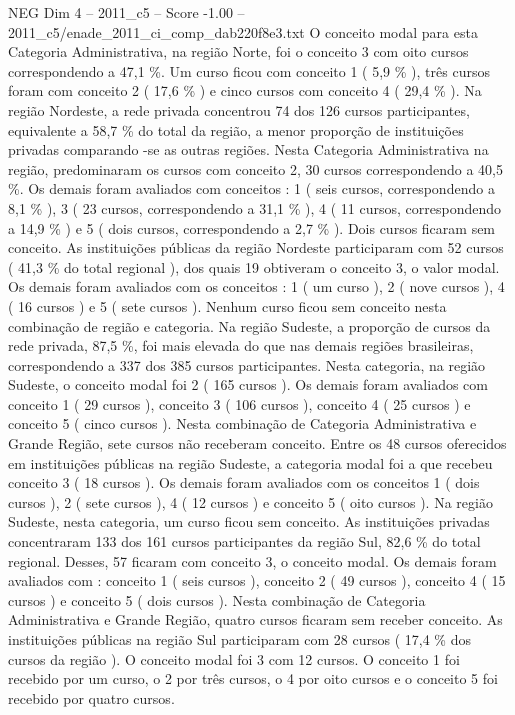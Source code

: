 \begin{textsample}{NEG Dim 4 – 2011\_c5 – Score -1.00 – 2011\_c5/enade\_2011\_ci\_comp\_dab220f8e3.txt}
O conceito modal para esta Categoria Administrativa, na região Norte, foi o conceito 3 com oito cursos correspondendo a 47,1 \%.
Um curso ficou com conceito 1 ( 5,9 \% ), três cursos foram com conceito 2 ( 17,6 \% ) e cinco cursos com conceito 4 ( 29,4 \% ).
Na região Nordeste, a rede privada concentrou 74 dos 126 cursos participantes, equivalente a 58,7 \% do total da região, a menor proporção de instituições privadas comparando -se as outras regiões.
Nesta Categoria Administrativa na região, predominaram os cursos com conceito 2, 30 cursos correspondendo a 40,5 \%.
Os demais foram avaliados com conceitos : 1 ( seis cursos, correspondendo a 8,1 \% ), 3 ( 23 cursos, correspondendo a 31,1 \% ), 4 ( 11 cursos, correspondendo a 14,9 \% ) e 5 ( dois cursos, correspondendo a 2,7 \% ).
Dois cursos ficaram sem conceito.
As instituições públicas da região Nordeste participaram com 52 cursos ( 41,3 \% do total regional ), dos quais 19 obtiveram o conceito 3, o valor modal.
Os demais foram avaliados com os conceitos : 1 ( um curso ), 2 ( nove cursos ), 4 ( 16 cursos ) e 5 ( sete cursos ).
Nenhum curso ficou sem conceito nesta combinação de região e categoria.
Na região Sudeste, a proporção de cursos da rede privada, 87,5 \%, foi mais elevada do que nas demais regiões brasileiras, correspondendo a 337 dos 385 cursos participantes.
Nesta categoria, na região Sudeste, o conceito modal foi 2 ( 165 cursos ).
Os demais foram avaliados com conceito 1 ( 29 cursos ), conceito 3 ( 106 cursos ), conceito 4 ( 25 cursos ) e conceito 5 ( cinco cursos ).
Nesta combinação de Categoria Administrativa e Grande Região, sete cursos não receberam conceito.
Entre os 48 cursos oferecidos em instituições públicas na região Sudeste, a categoria modal foi a que recebeu conceito 3 ( 18 cursos ).
Os demais foram avaliados com os conceitos 1 ( dois cursos ), 2 ( sete cursos ), 4 ( 12 cursos ) e conceito 5 ( oito cursos ).
Na região Sudeste, nesta categoria, um curso ficou sem conceito.
As instituições privadas concentraram 133 dos 161 cursos participantes da região Sul, 82,6 \% do total regional.
Desses, 57 ficaram com conceito 3, o conceito modal.
Os demais foram avaliados com : conceito 1 ( seis cursos ), conceito 2 ( 49 cursos ), conceito 4 ( 15 cursos ) e conceito 5 ( dois cursos ).
Nesta combinação de Categoria Administrativa e Grande Região, quatro cursos ficaram sem receber conceito.
As instituições públicas na região Sul participaram com 28 cursos ( 17,4 \% dos cursos da região ).
O conceito modal foi 3 com 12 cursos.
O conceito 1 foi recebido por um curso, o 2 por três cursos, o 4 por oito cursos e o conceito 5 foi recebido por quatro cursos.

\end{textsample}
